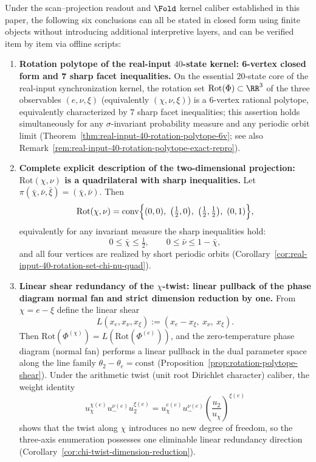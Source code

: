 \begin{theorem}\label{thm:tri-interface-discrete-convex-arithmetic}
Under the scan--projection readout and \(\Fold\) kernel caliber established in this paper, the following six conclusions can all be stated in closed form using finite objects without introducing additional interpretive layers, and can be verified item by item via offline scripts:
\begin{enumerate}
  \item \textbf{Rotation polytope of the real-input \(40\)-state kernel: 6-vertex closed form and 7 sharp facet inequalities.}
  On the essential \(20\)-state core of the real-input synchronization kernel, the rotation set \(\mathrm{Rot}(\Phi)\subset\RR^3\) of the three observables \((e,\nu,\xi)\) (equivalently \((\chi,\nu,\xi)\)) is a \(6\)-vertex rational polytope, equivalently characterized by \(7\) sharp facet inequalities; this assertion holds simultaneously for any \(\sigma\)-invariant probability measure and any periodic orbit limit (Theorem~\ref{thm:real-input-40-rotation-polytope-6v}; see also Remark~\ref{rem:real-input-40-rotation-polytope-exact-repro}).

  \item \textbf{Complete explicit description of the two-dimensional projection: \(\mathrm{Rot}(\chi,\nu)\) is a quadrilateral with sharp inequalities.}
  Let \(\pi(\bar\chi,\bar\nu,\bar\xi)=(\bar\chi,\bar\nu)\). Then
  \[
  \mathrm{Rot}(\chi,\nu)
  =\mathrm{conv}\Bigl\{(0,0),\ \bigl(\tfrac12,0\bigr),\ \bigl(\tfrac12,\tfrac12\bigr),\ (0,1)\Bigr\},
  \]
  equivalently for any invariant measure the sharp inequalities hold:
  \[
  0\le \bar\chi\le\tfrac12,
  \qquad
  0\le \bar\nu\le 1-\bar\chi,
  \]
  and all four vertices are realized by short periodic orbits (Corollary~\ref{cor:real-input-40-rotation-set-chi-nu-quad}).

  \item \textbf{Linear shear redundancy of the \(\chi\)-twist: linear pullback of the phase diagram normal fan and strict dimension reduction by one.}
  From \(\chi=e-\xi\) define the linear shear
  \[
  L(x_e,x_\nu,x_\xi):=(x_e-x_\xi,\ x_\nu,\ x_\xi).
  \]
  Then
  \(
  \mathrm{Rot}(\Phi^{(\chi)})=L(\mathrm{Rot}(\Phi^{(e)}))
  \), and the zero-temperature phase diagram (normal fan) performs a linear pullback in the dual parameter space along the line family \(\theta_2-\theta_e=\mathrm{const}\) (Proposition~\ref{prop:rotation-polytope-shear}).
  Under the arithmetic twist (unit root Dirichlet character) caliber, the weight identity
  \[
  u_\chi^{\chi(e)}u_-^{\nu(e)}u_2^{\xi(e)}
  =u_\chi^{e(e)}u_-^{\nu(e)}\left(\frac{u_2}{u_\chi}\right)^{\xi(e)}
  \]
  shows that the twist along \(\chi\) introduces no new degree of freedom, so the three-axis enumeration possesses one eliminable linear redundancy direction (Corollary~\ref{cor:chi-twist-dimension-reduction}).


\end{enumerate}
\end{theorem}

